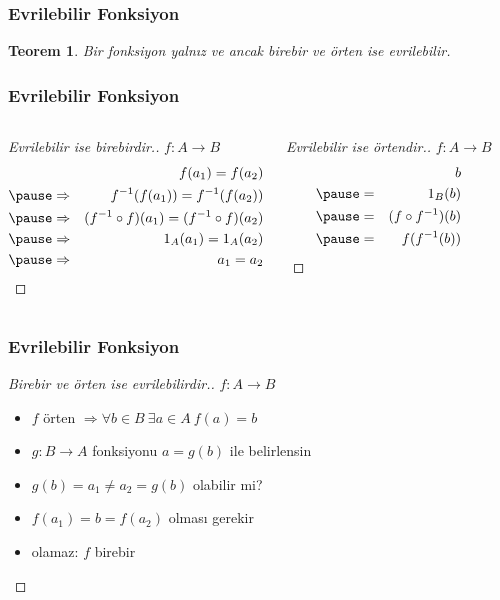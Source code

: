 \documentclass[dvipsnames]{beamer}
\theoremstyle{definition}
\theoremstyle{example}
\theoremstyle{plain}
\newtheorem{teorem}[theorem]{Teorem}
\begin{document}
\begin{frame}
  \frametitle{Evrilebilir Fonksiyon}

  \begin{teorem}
    Bir fonksiyon yalnız ve ancak birebir ve örten ise evrilebilir.
  \end{teorem}
\end{frame}

\begin{frame}
  \frametitle{Evrilebilir Fonksiyon}

  \begin{columns}[t]
    \begin{proof}[Evrilebilir ise birebirdir.]
      $f: A \rightarrow B$
      \begin{eqnarray*}
        &             & f(a_1) = f(a_2)\\\pause
        & \Rightarrow & f^{-1}(f(a_1)) = f^{-1}(f(a_2))\\\pause
        & \Rightarrow & (f^{-1} \circ f) (a_1) = (f^{-1} \circ f) (a_2)\\\pause
        & \Rightarrow & 1_A (a_1) = 1_A (a_2)\\\pause
        & \Rightarrow & a_1 = a_2
      \end{eqnarray*}
    \end{proof}

    \pause
    \begin{proof}[Evrilebilir ise örtendir.]
      $f: A \rightarrow B$
      \begin{eqnarray*}
        &   & b\\\pause
        & = & 1_B (b)\\\pause
        & = & (f \circ f^{-1}) (b)\\\pause
        & = & f(f^{-1} (b))
      \end{eqnarray*}
    \end{proof}
  \end{columns}
\end{frame}

\begin{frame}
  \frametitle{Evrilebilir Fonksiyon}

  \begin{proof}[Birebir ve örten ise evrilebilirdir.]
    $f: A \rightarrow B$
    \begin{itemize}
      \item $f$ örten $\Rightarrow \forall b \in B~\exists a \in A~f(a)=b$
      \item $g: B \rightarrow A$ fonksiyonu $a=g(b)$ ile belirlensin

      \pause
      \medskip
      \item $g(b) = a_1 \neq a_2 = g(b)$ olabilir mi?

      \pause
      \item $f(a_1) = b = f(a_2)$ olması gerekir
      \item olamaz: $f$ birebir
    \end{itemize}
  \end{proof}
\end{frame}
\end{document}
